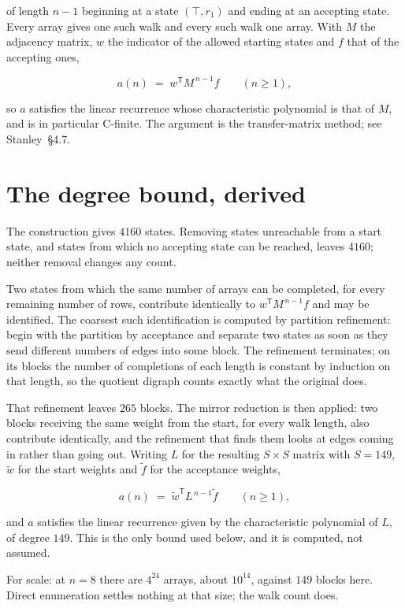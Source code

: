 \documentclass[11pt]{article}
\theoremstyle{definition}
\begin{document}
of length $n-1$ beginning at a state $(\top,r_1)$ and ending at an accepting state. Every array gives one such walk and every such walk one array. With $M$ the adjacency matrix, $w$ the indicator of the allowed starting states and $f$ that of the accepting ones,

\[a(n) \;=\; w^{\mathsf T} M^{\,n-1} f \qquad (n \ge 1),\]

so $a$ satisfies the linear recurrence whose characteristic polynomial is that of $M$, and is in particular C-finite. The argument is the transfer-matrix method; see Stanley~\S4.7.

\section{The degree bound, derived}

The construction gives $4160$ states. Removing states unreachable from a start state, and states from which no accepting state can be reached, leaves $4160$; neither removal changes any count.

Two states from which the same number of arrays can be completed, for every remaining number of rows, contribute identically to $w^{\mathsf T}M^{\,n-1}f$ and may be identified. The coarsest such identification is computed by partition refinement: begin with the partition by acceptance and separate two states as soon as they send different numbers of edges into some block. The refinement terminates; on its blocks the number of completions of each length is constant by induction on that length, so the quotient digraph counts exactly what the original does.

That refinement leaves $265$ blocks. The mirror reduction is then applied: two blocks receiving the same weight from the start, for every walk length, also contribute identically, and the refinement that finds them looks at edges coming in rather than going out. Writing $L$ for the resulting $S \times S$ matrix with $S = 149$, $\tilde w$ for the start weights and $\tilde f$ for the acceptance weights,

\[a(n) \;=\; \tilde w^{\mathsf T} L^{\,n-1} \tilde f \qquad (n \ge 1),\]

and $a$ satisfies the linear recurrence given by the characteristic polynomial of $L$, of degree $149$. This is the only bound used below, and it is computed, not assumed.

For scale: at $n = 8$ there are $4^{24}$ arrays, about $10^{14}$, against $149$ blocks here. Direct enumeration settles nothing at that size; the walk count does.
\end{document}

